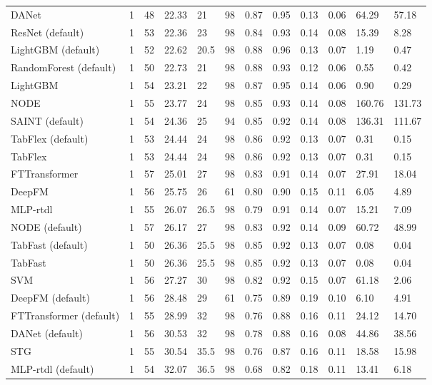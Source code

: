 \begin{tabular}{lllllrllllll}
DANet & 1 & 48 & 22.33 & 21 & 98 & 0.87 & 0.95 & 0.13 & 0.06 & 64.29 & 57.18 \\
ResNet (default) & 1 & 53 & 22.36 & 23 & 98 & 0.84 & 0.93 & 0.14 & 0.08 & 15.39 & 8.28 \\
LightGBM (default) & 1 & 52 & 22.62 & 20.5 & 98 & 0.88 & 0.96 & 0.13 & 0.07 & 1.19 & 0.47 \\
RandomForest (default) & 1 & 50 & 22.73 & 21 & 98 & 0.88 & 0.93 & 0.12 & 0.06 & 0.55 & 0.42 \\
LightGBM & 1 & 54 & 23.21 & 22 & 98 & 0.87 & 0.95 & 0.14 & 0.06 & 0.90 & 0.29 \\
NODE & 1 & 55 & 23.77 & 24 & 98 & 0.85 & 0.93 & 0.14 & 0.08 & 160.76 & 131.73 \\
SAINT (default) & 1 & 54 & 24.36 & 25 & 94 & 0.85 & 0.92 & 0.14 & 0.08 & 136.31 & 111.67 \\
TabFlex (default) & 1 & 53 & 24.44 & 24 & 98 & 0.86 & 0.92 & 0.13 & 0.07 & 0.31 & 0.15 \\
TabFlex & 1 & 53 & 24.44 & 24 & 98 & 0.86 & 0.92 & 0.13 & 0.07 & 0.31 & 0.15 \\
FTTransformer & 1 & 57 & 25.01 & 27 & 98 & 0.83 & 0.91 & 0.14 & 0.07 & 27.91 & 18.04 \\
DeepFM & 1 & 56 & 25.75 & 26 & 61 & 0.80 & 0.90 & 0.15 & 0.11 & 6.05 & 4.89 \\
MLP-rtdl & 1 & 55 & 26.07 & 26.5 & 98 & 0.79 & 0.91 & 0.14 & 0.07 & 15.21 & 7.09 \\
NODE (default) & 1 & 57 & 26.17 & 27 & 98 & 0.83 & 0.92 & 0.14 & 0.09 & 60.72 & 48.99 \\
TabFast (default) & 1 & 50 & 26.36 & 25.5 & 98 & 0.85 & 0.92 & 0.13 & 0.07 & 0.08 & 0.04 \\
TabFast & 1 & 50 & 26.36 & 25.5 & 98 & 0.85 & 0.92 & 0.13 & 0.07 & 0.08 & 0.04 \\
SVM & 1 & 56 & 27.27 & 30 & 98 & 0.82 & 0.92 & 0.15 & 0.07 & 61.18 & 2.06 \\
DeepFM (default) & 1 & 56 & 28.48 & 29 & 61 & 0.75 & 0.89 & 0.19 & 0.10 & 6.10 & 4.91 \\
FTTransformer (default) & 1 & 55 & 28.99 & 32 & 98 & 0.76 & 0.88 & 0.16 & 0.11 & 24.12 & 14.70 \\
DANet (default) & 1 & 56 & 30.53 & 32 & 98 & 0.78 & 0.88 & 0.16 & 0.08 & 44.86 & 38.56 \\
STG & 1 & 55 & 30.54 & 35.5 & 98 & 0.76 & 0.87 & 0.16 & 0.11 & 18.58 & 15.98 \\
MLP-rtdl (default) & 1 & 54 & 32.07 & 36.5 & 98 & 0.68 & 0.82 & 0.18 & 0.11 & 13.41 & 6.18 \\

\end{tabular}

